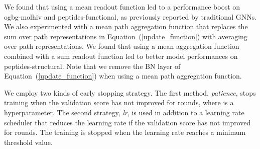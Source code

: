 \documentclass{article}
\theoremstyle{plain}
\theoremstyle{definition}
\theoremstyle{remark}
\begin{document}
We found that using a mean readout function led to a performance boost on ogbg-molhiv and peptides-functional, as previously reported by traditional GNNs. We also experimented with a mean path aggregation function that replaces the sum over path representations in Equation~(\ref{update_function}) with averaging over path representations. We found that using a mean aggregation function combined with a sum readout function led to better model performances on peptides-structural. Note that we remove the BN layer of Equation~(\ref{update_function}) when using a mean path aggregation function.

We employ two kinds of early stopping strategy. The first method, \textit{patience}, stops training when the validation score has not improved for  rounds, where  is a hyperparameter. The second strategy, \textit{lr}, is used in addition to a learning rate scheduler that reduces the learning rate if the validation score has not improved for  rounds. The training is stopped when the learning rate reaches a minimum threshold value. 
\end{document}
